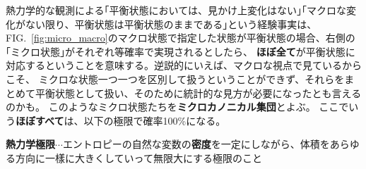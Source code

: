\documentclass[
]{ltjsbook}
\begin{document}
熱力学的な観測による｢平衡状態においては、見かけ上変化はない｣｢マクロな変化がない限り、平衡状態は平衡状態のままである｣という経験事実は、
FIG.~\ref{fig:micro_macro}のマクロ状態で指定した状態が平衡状態の場合、右側の｢ミクロ状態｣がそれぞれ等確率で実現されるとしたら、
\textbf{ほぼ全て}が平衡状態に対応するということを意味する。逆説的にいえば、マクロな視点で見ているからこそ、
ミクロな状態一つ一つを区別して扱うということができず、それらをまとめて平衡状態として扱い、そのために統計的な見方が必要になったとも言えるのかも。
このようなミクロ状態たちを\textbf{ミクロカノニカル集団}とよぶ。
ここでいう\textbf{ほぼすべて}は、以下の極限で確率100\%になる。

\textbf{熱力学極限}\(\cdots\)エントロピーの自然な変数の\textbf{密度}を一定にしながら、体積をあらゆる方向に一樣に大きくしていって無限大にする極限のこと
\end{document}
